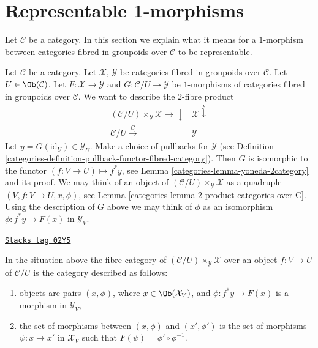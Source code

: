 \section{Representable 1-morphisms}
\label{categories-section-representable-1-morphisms}
Let $\mathcal{C}$ be a category.
In this section we explain what it means for a $1$-morphism
between categories fibred in groupoids over $\mathcal{C}$
to be representable.

\medskip\noindent
Let $\mathcal{C}$ be a category.
Let $\mathcal{X}$, $\mathcal{Y}$ be categories fibred in groupoids
over $\mathcal{C}$.
Let $U \in \Ob(\mathcal{C})$.
Let $F : \mathcal{X} \to \mathcal{Y}$ and
$G : \mathcal{C}/U \to \mathcal{Y}$ be $1$-morphisms of categories
fibred in groupoids over $\mathcal{C}$.
We want to describe
the $2$-fibre product
$$
\begin{array}{cc}(\mathcal{C}/U) \times_\mathcal{Y} \mathcal{X} \longrightarrow\downarrow & \mathcal{X} \overset{F}{\downarrow} \\ \mathcal{C}/U \overset{G}{\longrightarrow} & \mathcal{Y}\end{array}
$$
Let $y = G(\text{id}_U) \in \mathcal{Y}_U$.
Make a choice of pullbacks for $\mathcal{Y}$
(see Definition \ref{categories-definition-pullback-functor-fibred-category}).
Then $G$ is isomorphic to the functor $(f : V \to U) \mapsto f^*y$,
see Lemma \ref{categories-lemma-yoneda-2category} and its proof.
We may think of an object of
$(\mathcal{C}/U) \times_\mathcal{Y} \mathcal{X}$
as a quadruple $(V, f : V \to U, x, \phi)$, see
Lemma \ref{categories-lemma-2-product-categories-over-C}.
Using the description of $G$ above we may think of $\phi$ as
an isomorphism $\phi : f^*y \to F(x)$ in $\mathcal{Y}_V$.

\begin{lemma}
\label{categories-lemma-identify-fibre-product}
\href{https://stacks.math.columbia.edu/tag/02Y5}{\texttt{Stacks tag 02Y5}}

In the situation above the fibre category of
$(\mathcal{C}/U) \times_\mathcal{Y} \mathcal{X}$ over
an object $f : V \to U$ of $\mathcal{C}/U$
is the category described as follows:
\begin{enumerate}
\item objects are pairs $(x, \phi)$,
where $x \in \Ob(\mathcal{X}_V)$, and
$\phi : f^*y \to F(x)$ is a morphism in $\mathcal{Y}_V$,
\item the set of morphisms between $(x, \phi)$ and $(x', \phi')$
is the set of morphisms $\psi : x \to x'$ in $\mathcal{X}_V$
such that $F(\psi) = \phi' \circ \phi^{-1}$.
\end{enumerate}
\end{lemma}

